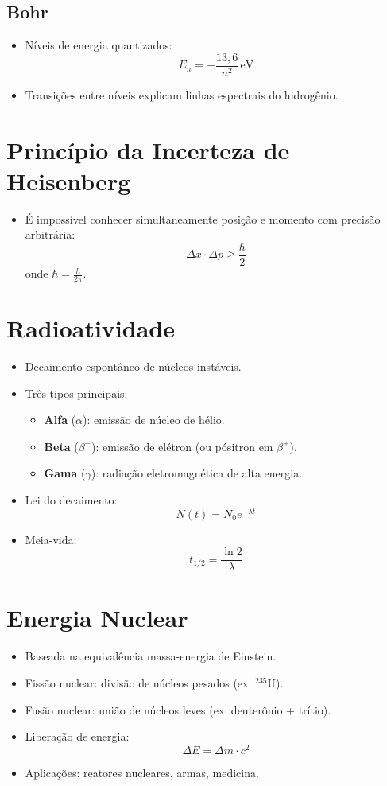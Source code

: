 \documentclass[a4paper,12pt]{article}
\newcommand{\printingbibliography}{%

    \pagestyle{myheadings}
    \markright{}
    \sloppy
    \printbibliography[heading=bibintoc, %
                   title=Refer\^encias %
                  ]
    \fussy%
}
\begin{document}
\begin{multicols}{2}
\subsection{Bohr}
\begin{itemize}
    \item Níveis de energia quantizados:
    \[
        E_n = -\frac{13{,}6}{n^2} \, \text{eV}
    \]
    \item Transições entre níveis explicam linhas espectrais do hidrogênio.
\end{itemize}

\section{Princípio da Incerteza de Heisenberg}
\begin{itemize}
    \item É impossível conhecer simultaneamente posição e momento com precisão arbitrária:
    \[
        \Delta x \cdot \Delta p \geq \frac{\hbar}{2}
    \]
    onde $\hbar = \frac{h}{2\pi}$.
\end{itemize}

\section{Radioatividade}
\begin{itemize}
    \item Decaimento espontâneo de núcleos instáveis.
    \item Três tipos principais:
    \begin{itemize}
        \item \textbf{Alfa} ($\alpha$): emissão de núcleo de hélio.
        \item \textbf{Beta} ($\beta^-$): emissão de elétron (ou pósitron em $\beta^+$).
        \item \textbf{Gama} ($\gamma$): radiação eletromagnética de alta energia.
    \end{itemize}
    \item Lei do decaimento:
    \[
        N(t) = N_0 e^{-\lambda t}
    \]
    \item Meia-vida:
    \[
        t_{1/2} = \frac{\ln 2}{\lambda}
    \]
\end{itemize}

\section{Energia Nuclear}
\begin{itemize}
    \item Baseada na equivalência massa-energia de Einstein.
    \item Fissão nuclear: divisão de núcleos pesados (ex: $^{235}$U).
    \item Fusão nuclear: união de núcleos leves (ex: deuterônio + trítio).
    \item Liberação de energia:
    \[
        \Delta E = \Delta m \cdot c^2
    \]
    \item Aplicações: reatores nucleares, armas, medicina.
\end{itemize}

\end{multicols}

\end{document}

